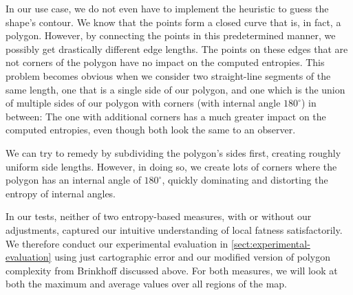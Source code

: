 In our use case, we do not even have to implement the heuristic to guess the shape's contour.
We know that the points form a closed curve that is, in fact, a polygon.
However, by connecting the points in this predetermined manner, we possibly get drastically different edge lengths.
The points on these edges that are not corners of the polygon have no impact on the computed entropies.
This problem becomes obvious when we consider two straight-line segments of the same length, one that is a single side of our polygon, and one which is the union of multiple sides of our polygon with corners (with internal angle $180^\circ$) in between:
The one with additional corners has a much greater impact on the computed entropies, even though both look the same to an observer.

We can try to remedy by subdividing the polygon's sides first, creating roughly uniform side lengths.
However, in doing so, we create lots of corners where the polygon has an internal angle of $180^\circ$, quickly dominating and distorting the entropy of internal angles.

In our tests, neither of two entropy-based measures, with or without our adjustments, captured our intuitive understanding of local fatness satisfactorily.
We therefore conduct our experimental evaluation in \cref{sect:experimental-evaluation} using just cartographic error and our modified version of polygon complexity from Brinkhoff \etal{} \cite{brinkhoff1995measuring} discussed above.
For both measures, we will look at both the maximum and average values over all regions of the map.
